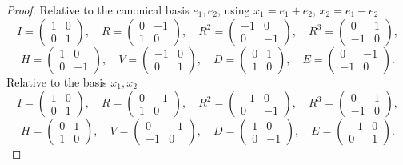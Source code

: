 \begin{proof}
    Relative to the canonical basis $e_1, e_2$, using $x_1 = e_1 + e_2$, $x_2 = e_1 - e_2$
    \[
    I = \begin{pmatrix} 1 & 0 \\ 0 & 1 \end{pmatrix}, \quad
    R = \begin{pmatrix} 0 & -1 \\ 1 & 0 \end{pmatrix}, \quad
    R^2 = \begin{pmatrix} -1 & 0 \\ 0 & -1 \end{pmatrix}, \quad
    R^3 = \begin{pmatrix} 0 & 1 \\ -1 & 0 \end{pmatrix},
    \]
    \[
    H = \begin{pmatrix} 1 & 0 \\ 0 & -1 \end{pmatrix}, \quad
    V = \begin{pmatrix} -1 & 0 \\ 0 & 1 \end{pmatrix}, \quad
    D = \begin{pmatrix} 0 & 1 \\ 1 & 0 \end{pmatrix}, \quad
    E = \begin{pmatrix} 0 & -1 \\ -1 & 0 \end{pmatrix}.
    \]
    Relative to the basis $x_1, x_2$
    \[
    I = \begin{pmatrix} 1 & 0 \\ 0 & 1 \end{pmatrix}, \quad
    R = \begin{pmatrix} 0 & -1 \\ 1 & 0 \end{pmatrix}, \quad
    R^2 = \begin{pmatrix} -1 & 0 \\ 0 & -1 \end{pmatrix}, \quad
    R^3 = \begin{pmatrix} 0 & 1 \\ -1 & 0 \end{pmatrix},
    \]
    \[
    H = \begin{pmatrix} 0 & 1 \\ 1 & 0 \end{pmatrix}, \quad
    V = \begin{pmatrix} 0 & -1 \\ -1 & 0 \end{pmatrix}, \quad
    D = \begin{pmatrix} 1 & 0 \\ 0 & -1 \end{pmatrix}, \quad
    E = \begin{pmatrix} -1 & 0 \\ 0 & 1 \end{pmatrix}.
    \]
\end{proof}